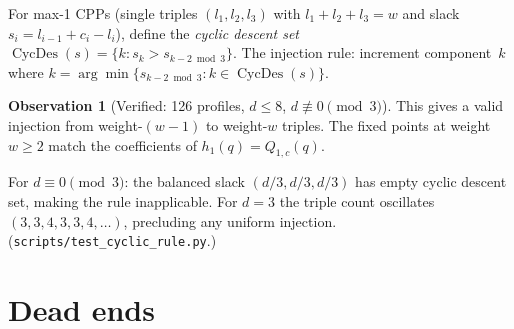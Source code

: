 \documentclass[11pt]{article}
\theoremstyle{plain}
\theoremstyle{definition}
\newtheorem{observation}[theorem]{Observation}
\theoremstyle{remark}
\begin{document}
For max-1 CPPs (single triples $(l_1, l_2, l_3)$ with $l_1 + l_2 + l_3 = w$
and slack $s_i = l_{i-1} + c_i - l_i$), define the
\emph{cyclic descent set}
$\operatorname{CycDes}(s) = \{k : s_k > s_{k-2 \bmod 3}\}$.
The injection rule: increment component~$k$ where
$k = \arg\min\{s_{k-2 \bmod 3} : k \in \operatorname{CycDes}(s)\}$.

\begin{observation}[Verified: 126 profiles, $d \leq 8$,
$d \not\equiv 0 \pmod 3$]
This gives a valid injection from weight-$(w-1)$ to weight-$w$
triples. The fixed points at weight~$w \geq 2$ match the
coefficients of $h_1(q) = Q_{1,c}(q)$.
\end{observation}

For $d \equiv 0 \pmod{3}$: the balanced slack $(d/3,d/3,d/3)$
has empty cyclic descent set, making the rule inapplicable.
For $d = 3$ the triple count oscillates $(3,3,4,3,3,4,\ldots)$,
precluding any uniform injection.
(\texttt{scripts/test\_cyclic\_rule.py}.)


\section{Dead ends}
\label{sec:dead-ends}
\end{document}
